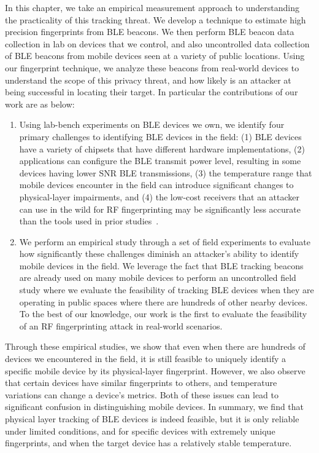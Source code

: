 In this chapter, we take an empirical measurement approach to understanding the practicality of this tracking threat. 
%
We develop a technique to estimate high precision fingerprints from BLE beacons.
%
We then perform BLE beacon data collection in lab on devices that we control, and also uncontrolled data collection of BLE beacons from mobile devices seen at a variety of public locations.
%
Using our fingerprint technique, we analyze these beacons from real-world devices to understand the scope of this privacy threat, and how likely is an attacker at being successful in locating their target. 
%
In particular the contributions of our work are as below:

\begin{enumerate}
\item Using lab-bench experiments on BLE devices we own, we identify four primary challenges to identifying BLE devices in the field: (1) BLE devices have a variety of chipsets that have different
hardware implementations, (2) applications can configure the BLE transmit
power level, resulting in some devices having lower SNR BLE transmissions,
(3) the temperature range that mobile devices encounter in the field
can introduce significant changes to physical-layer impairments, and (4) the low-cost
receivers that an attacker can use in the wild for RF fingerprinting may be significantly less accurate than the tools used in prior studies~\cite{Brik_radiometric}.
 
\item We perform an empirical study through a set of field experiments to evaluate how
significantly these challenges diminish an attacker's ability to identify
mobile devices in the field. We leverage the fact that BLE tracking beacons are
already used on many mobile devices to perform an uncontrolled field study
where we evaluate the feasibility of tracking BLE devices when they
are operating in public spaces where there are hundreds of other nearby devices.
 To the best of our knowledge, our work is
the first to evaluate the feasibility of an RF fingerprinting attack in
real-world scenarios.
\end{enumerate}

Through these empirical studies, we show that even when there are hundreds of devices we encountered in the field, it is still feasible to uniquely identify 
a specific mobile device by its physical-layer fingerprint. 
%
However, we also
observe that certain devices have similar fingerprints to others, and temperature
variations can change a device's metrics. 
%
Both of these issues can lead to significant confusion in distinguishing mobile devices.
%
In summary, we find that physical layer tracking of
BLE devices is indeed feasible, but it is only
reliable under limited conditions, and for specific devices with extremely
unique fingerprints, and when the target device has a relatively stable
temperature. 

